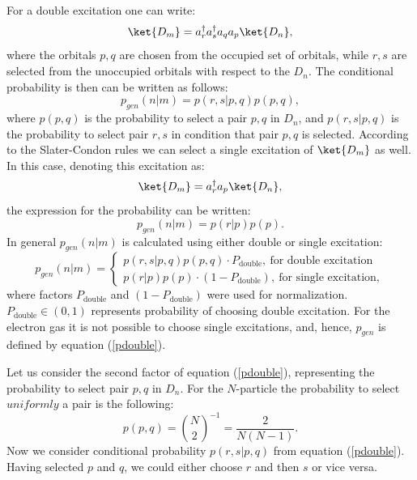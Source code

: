 \documentclass[twoside,english]{uiofysmaster}
\begin{document}
For a  double excitation one can write:
\begin{equation}
\ket{D_{m}}=a^\dagger_r a^\dagger_s a_q a_p \ket{D_n}, 
\end{equation}
where the orbitals $p,q$ are chosen from the occupied set of orbitals, while $r,s$ are selected from the unoccupied orbitals with respect to the $D_n$. The conditional probability is then can be written as follows:
\begin{equation}\label{pdouble}
p_{gen}(n|m) = p(r,s|p,q)p(p,q),
\end{equation}
where $p(p,q)$ is the probability to select a pair $p,q$ in $D_n$, and $p(r,s|p,q)$ is the probability to select pair $r,s$ in condition that pair $p,q$ is selected.
According to the Slater-Condon rules we can select a single excitation of $\ket{D_m}$ as well. In this case, denoting this excitation as:
\begin{equation*}
\ket{D_{m}}=a^\dagger_r  a_p \ket{D_n},
\end{equation*}
the expression for the probability can be written:
\begin{equation}
p_{gen}(n|m) = p(r|p)p(p).
\end{equation}
In general $p_{gen}(n|m)$ is calculated using either double or single excitation:
\[
p_{gen}(n|m)=\left\{
\begin{array}{ll}
p(r,s|p,q)p(p,q) \cdot P_{\text{double}}, \ \text{for double excitation}\\
p(r|p)p(p) \cdot (1-P_{\text{double}}), \ \text{for single excitation},
\end{array}
\right.
\]
where factors $P_{\text{double}}$ and $(1-P_{\text{double}})$ were used for normalization. $P_{\text{double}} \in (0,1)$ represents probability of choosing double excitation. For the electron gas it is not possible to choose single excitations, and, hence, $p_{gen}$ is defined by equation (\ref{pdouble}).

Let us consider the second factor of equation (\ref{pdouble}), representing the probability to select pair $p,q$ in $D_n$. For the $N$-particle the probability to select $uniformly$ a pair is the following:
\begin{equation}
p(p,q) = {\binom{N}{2}}^{-1} = \frac{2}{N(N-1)}.
\end{equation}
Now we consider conditional probability $p(r,s|p,q)$ from equation (\ref{pdouble}). Having selected $p$ and $q$, we could either choose $r$ and then $s$ or vice versa.
\end{document}
